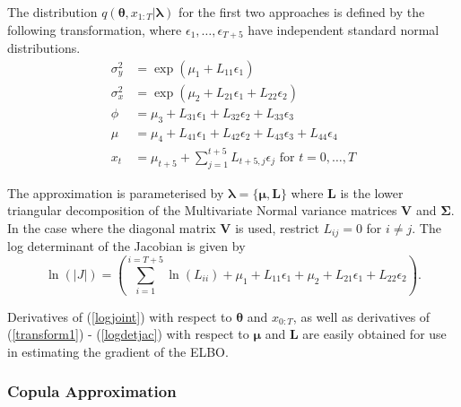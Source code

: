 \documentclass[12pt,a4paper]{article}%
\numberwithin{equation}{section}
\begin{document}
{{{{{{The distribution $q(\boldsymbol{\theta}, x_{1:T} | \boldsymbol{\lambda})$ for the first two approaches is defined by the following transformation, where $\epsilon_{1}, \dots, \epsilon_{T+5}$ have independent standard normal distributions.
\begin{align}
\sigma^2_y &= \exp(\mu_1 + L_{11} \epsilon_1)  \label{transform1} \\
\sigma^2_x &= \exp(\mu_2 + L_{21} \epsilon_1 + L_{22} \epsilon_2) \label{transform2} \\
\phi &= \mu_3 + L_{31} \epsilon_1 + L_{32} \epsilon_2 + L_{33} \epsilon_3 \label{transform3} \\
\mu &= \mu_4 + L_{41} \epsilon_1 + L_{42} \epsilon_2 + L_{43} \epsilon_3 + L_{44} \epsilon_4 \label{transform4} \\
x_t &= \mu_{t+5} + \sum_{j=1}^{t+5} L_{t+5, j} \epsilon_j \mbox{ for } t = 0, \dots, T \label{transform5} 
\end{align}

The approximation is parameterised by $\boldsymbol{\lambda} = \{ \boldsymbol{\mu}, \textbf{L} \}$ where $\textbf{L}$ is the lower triangular decomposition of the Multivariate Normal variance matrices $\textbf{V}$ and $\boldsymbol{\Sigma}$. In the case where the diagonal matrix $\textbf{V}$ is used, restrict $L_{ij} = 0$ for $i \neq j$.
The log determinant of the Jacobian is given by
\begin{equation}
\label{logdetjac}
\ln(|J|) = \left(\sum_{i = 1}^{i = T+5} \ln(L_{ii}) + \mu_1 + L_{11} \epsilon_1 + \mu_2 + L_{21} \epsilon_1 + L_{22} \epsilon_2\right).  
\end{equation}

Derivatives of (\ref{logjoint}) with respect to $\boldsymbol{\theta}$ and $x_{0:T}$, as well as derivatives of (\ref{transform1}) - (\ref{logdetjac}) with respect to $\boldsymbol{\mu}$ and $\textbf{L}$ are easily obtained for use in estimating the gradient of the ELBO.

\subsubsection{Copula Approximation}

}}}}}}
\end{document}
